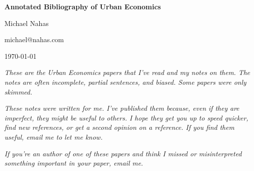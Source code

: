 \documentclass[12pt]{article}
\begin{document}
\begin{center}
   {\Large\textbf{Annotated Bibliography of Urban Economics}}
\medskip

   {\large   Michael Nahas
\medskip

	michael@nahas.com
\medskip

           \today
   }
\end{center}

\emph{These are the Urban Economics papers that I've read and my notes on them.  The notes are often incomplete, partial sentences, and biased.  Some papers were only skimmed.}

\emph{These notes were written for me.  I've published them because, even if they are imperfect, they might be useful to others.  I hope they get you up to speed quicker, find new references, or get a second opinion on a reference.  If you find them useful, email me to let me know.}

\emph{If you're an author of one of these papers and think I missed or misinterpreted something important in your paper, email me. }

\nocite{*}



\end{document}
